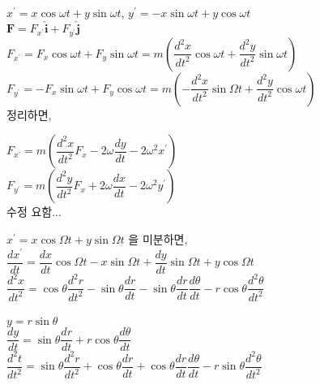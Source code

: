 $ x^{\prime} = x \cos \omega t + y \sin \omega t$, 
$ y^{\prime} = -x \sin \omega t + y \cos \omega t$\\

$ \mathbf {F} = F_{x^{\prime}} \mathbf {\hat{i}}  + F_{y^{\prime}} \mathbf {\hat{j}} $\\

$ F_{x^{\prime}} = F_{x} \cos \omega t + F_{y} \sin \omega t
= m \left ( \dfrac{d^{2}x}{dt^{2}} \cos \omega t + \dfrac{d^{2}y}{dt^{2}} \sin \omega t \right) $\\

$ F_{y^{\prime}} = -F_{x} \sin \omega t + F_{y} \cos \omega t
= m \left ( - \dfrac{d^{2}x}{dt^{2}} \sin \Omega t + \dfrac{d^{2}y}{dt^{2}} \cos \omega t \right) $\\

정리하면,


$ F_{x^{\prime}} = m \left( \dfrac{d^{2}x}{dt^{2}}F_{x} - 2 \omega  \dfrac{dy}{dt} - 2 \omega^{2} x^{\prime}  \right) $\\

$ F_{y^{\prime}} = m \left( \dfrac{d^{2}y}{dt^{2}}F_{x} + 2 \omega  \dfrac{dx}{dt} - 2 \omega^{2} y^{\prime}  \right) $\\



수정 요함...

$ x^{\prime} = x \cos \Omega t + y \sin \Omega t$ 을 미분하면,\\

$\dfrac{dx^{\prime}}{dt} = \dfrac{dx}{dt} \cos \Omega t - x \sin \Omega t +  \dfrac{dy}{dt} \sin \Omega t + y \cos \Omega t $ \\

$\dfrac{d^{2}x}{dt^{2}} = \cos \theta \dfrac{d^{2}r}{dt^{2}} - \sin \theta \dfrac{dr}{dt} - \sin \theta \dfrac{dr}{dt} \dfrac{d\theta}{dt} -r \cos \theta \dfrac{d^{2}\theta}{dt^{2}}$\\
\\
$ y = r \sin \theta $ \\

$\dfrac{dy}{dt} = \sin \theta \dfrac{dr}{dt} + r \cos \theta \dfrac{d\theta}{dt}$ \\

$\dfrac{d^{2}t}{dt^{2}} = \sin \theta \dfrac{d^{2}r}{dt^{2}} + \cos \theta \dfrac{dr}{dt} + \cos \theta \dfrac{dr}{dt} \dfrac{d\theta}{dt} -r \sin \theta \dfrac{d^{2}\theta}{dt^{2}}$\\
\\



